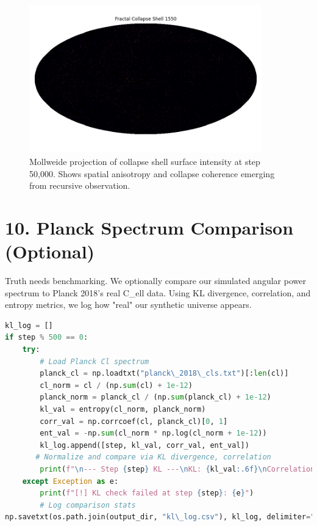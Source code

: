 \begin{figure}[H]
    \centering
    \includegraphics[width=0.9\textwidth]{images/moll_tensor_001550.png}
    \caption{Mollweide projection of collapse shell surface intensity at step 50,000. Shows spatial anisotropy and collapse coherence emerging from recursive observation.}
    \label{fig:mollweide_final}
\end{figure}
    

\section*{10. Planck Spectrum Comparison (Optional)}

Truth needs benchmarking. We optionally compare our simulated angular power spectrum to Planck 2018's real C\_ell data. Using KL divergence, correlation, and entropy metrics, we log how "real" our synthetic universe appears.

\begin{lstlisting}[language=Python]
kl_log = []
if step % 500 == 0:
    try:
        # Load Planck Cl spectrum
        planck_cl = np.loadtxt("planck\_2018\_cls.txt")[:len(cl)]
        cl_norm = cl / (np.sum(cl) + 1e-12)
        planck_norm = planck_cl / (np.sum(planck_cl) + 1e-12)
        kl_val = entropy(cl_norm, planck_norm)
        corr_val = np.corrcoef(cl, planck_cl)[0, 1]
        ent_val = -np.sum(cl_norm * np.log(cl_norm + 1e-12))
        kl_log.append([step, kl_val, corr_val, ent_val])
       # Normalize and compare via KL divergence, correlation
        print(f"\n--- Step {step} KL ---\nKL: {kl_val:.6f}\nCorrelation: {corr_val:.6f}\nEntropy: {ent_val:.6f}")
    except Exception as e:
        print(f"[!] KL check failed at step {step}: {e}")
        # Log comparison stats
np.savetxt(os.path.join(output_dir, "kl\_log.csv"), kl_log, delimiter=",", header="Step,KL,Correlation,Entropy")
\end{lstlisting}

